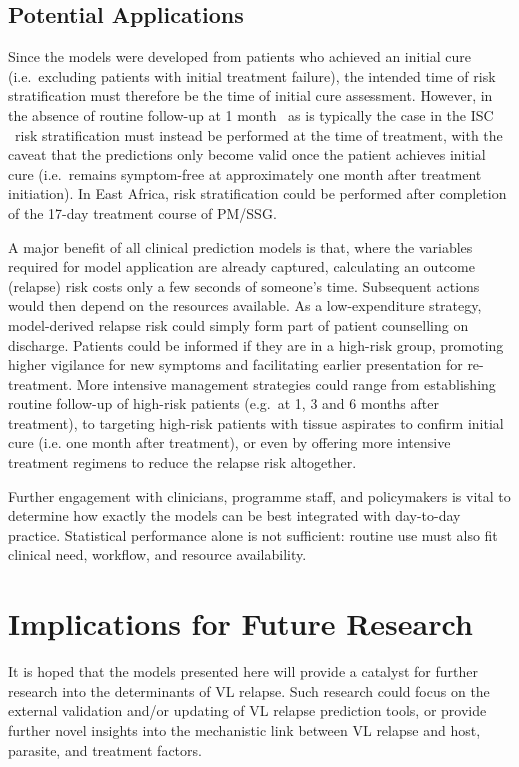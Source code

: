 \subsection{Potential Applications}

Since the models were developed from patients who achieved an initial cure (i.e.\ excluding patients with initial treatment failure), the intended time of risk stratification must therefore be the time of initial cure assessment. However, in the absence of routine follow-up at 1 month \textemdash\ as is typically the case in the ISC \textemdash\ risk stratification must instead be performed at the time of treatment, with the caveat that the predictions only become valid once the patient achieves initial cure (i.e.\ remains symptom-free at approximately one month after treatment initiation). In East Africa, risk stratification could be performed after completion of the 17-day treatment course of PM/SSG.

A major benefit of all clinical prediction models is that, where the variables required for model application are already captured, calculating an outcome (relapse) risk costs only a few seconds of someone's time. Subsequent actions would then depend on the resources available. As a low-expenditure strategy, model-derived relapse risk could simply form part of patient counselling on discharge. Patients could be informed if they are in a high-risk group, promoting higher vigilance for new symptoms and facilitating earlier presentation for re-treatment. More intensive management strategies could range from establishing routine follow-up of high-risk patients (e.g.\ at 1, 3 and 6 months after treatment), to targeting high-risk patients with tissue aspirates to confirm initial cure (i.e. one month after treatment), or even by offering more intensive treatment regimens to reduce the relapse risk altogether.

Further engagement with clinicians, programme staff, and policymakers is vital to determine how exactly the models can be best integrated with day-to-day practice. Statistical performance alone is not sufficient: routine use must also fit clinical need, workflow, and resource availability.

\section{Implications for Future Research\label{sec:future-research}}

It is hoped that the models presented here will provide a catalyst for further research into the determinants of VL relapse. Such research could focus on the external validation and/or updating of VL relapse prediction tools, or provide further novel insights into the mechanistic link between VL relapse and host, parasite, and treatment factors.

